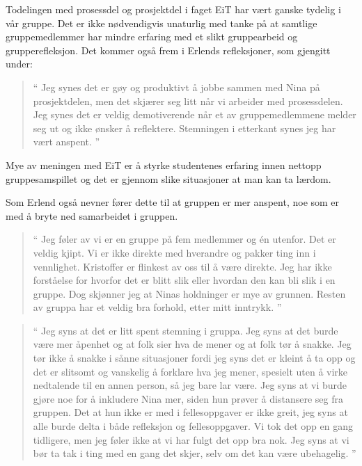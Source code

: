 Todelingen med prosessdel og prosjektdel i faget EiT har vært ganske tydelig i vår gruppe. Det er ikke 
nødvendigvis unaturlig med tanke på at samtlige gruppemedlemmer har mindre erfaring med et slikt gruppearbeid 
og grupperefleksjon. Det kommer også frem i Erlends refleksjoner, som gjengitt under:
\begin{quote}``
Jeg synes det er gøy og produktivt å jobbe sammen med Nina på prosjektdelen, men det skjærer seg litt når vi 
arbeider med prosessdelen. Jeg synes det er veldig demotiverende når et av gruppemedlemmene melder seg ut 
og ikke ønsker å reflektere. Stemningen i etterkant synes jeg har vært anspent.
''\end{quote} 
Mye av meningen med EiT er å styrke studentenes erfaring innen nettopp gruppesamspillet og det er gjennom
slike situasjoner at man kan ta lærdom. 

Som Erlend også nevner fører dette til at gruppen er mer anspent, noe som er med å bryte ned samarbeidet i 
gruppen. 

\begin{quote}``
Jeg føler av vi er en gruppe på fem medlemmer og én utenfor. Det er veldig kjipt.
Vi er ikke direkte med hverandre og pakker ting inn i vennlighet. Kristoffer er flinkest av oss til å være direkte.
Jeg har ikke forståelse for hvorfor det er blitt slik eller hvordan den kan bli slik i en gruppe. Dog skjønner jeg at 
Ninas holdninger er mye av grunnen. Resten av gruppa har et veldig bra forhold, etter mitt inntrykk.
''\end{quote} 

\begin{quote}``
Jeg syns at det er litt spent stemning i gruppa. Jeg syns at det burde være mer åpenhet og at folk sier hva de 
mener og at folk tør å snakke. Jeg tør ikke å snakke i sånne situasjoner fordi jeg syns det er kleint å ta opp og det 
er slitsomt og vanskelig å forklare hva jeg mener, spesielt uten å virke nedtalende til en annen person, så jeg bare 
lar være. Jeg syns at vi burde gjøre noe for å inkludere Nina mer, siden hun prøver å distansere seg fra gruppen. 
Det at hun ikke er med i fellesoppgaver er ikke greit, jeg syns at alle burde delta i både refleksjon og 
fellesoppgaver. Vi tok det opp en gang tidligere, men jeg føler ikke at vi har fulgt det opp bra nok. Jeg syns at vi bør 
ta tak i ting med en gang det skjer, selv om det kan være ubehagelig.
''\end{quote} 

